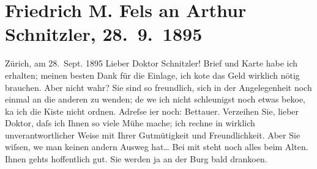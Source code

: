 

               \section[Friedrich M. Fels an Arthur Schnitzler, 28. 9. 1895]{ Friedrich M. Fels an Arthur Schnitzler, 28. 9. 1895}\nopagebreak{}\rehead{ }\begin{ledgroupsized}[t]{13cm}\normalsize\beginnumbering{} \toendnotes[C]{\smallbreak\pagebreak[2]} 
\toendnotes[C]{\smallbreak}\pstart
           \raggedleft{}{\pb}Zürich, am 28. Sept. 1895\pend
           \pstart\center{}Lieber Doktor Schnitzler!\pend\pstart
           Brief und Karte habe ich erhalten; meinen besten Dank für die Einlage, ich ko{\geminationn}te das Geld wirklich nötig brauchen. Aber nicht
                    wahr? Sie sind so freundlich, sich in der Angelegenheit noch einmal an die
                    anderen zu wenden; de{\geminationn} we{\geminationn} ich nicht \introOben{}schleunigst\introOben{}
                    noch etwas beko{\geminationm}e, ka{\geminationn}
                    ich die Kiste nicht ordnen. Adreſse i{\geminationm}er noch: Bettauer.\pend
           \pstart
           Verzeihen Sie, lieber Doktor, daſs ich Ihnen so viele Mühe mache; ich rechne in
                    wirklich unverantwortlicher Weise mit Ihrer Gutmütigkeit und Freundlichkeit.
                    Aber Sie wiſsen, we{\geminationn} man keinen andern Ausweg hat{\dots}\pend
           \pstart
           Bei mit steht noch alles beim Alten. Ihnen gehts hoffentlich gut. Sie werden ja
                    an der Burg bald dranko{\geminationm}en.\pend

\end{ledgroupsized}
